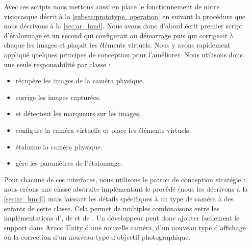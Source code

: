 Avec ces scripts nous mettons aussi en place le fonctionnement de notre visiocasque décrit à la \autoref{subsec:prototype_operation} en suivant la procédure que nous décrivons à la \autoref{sec:ar_hmd}. Nous avons donc d'abord écrit premier script d'étalonnage et un second qui configurait au démarrage puis qui corrigeait à chaque  les images et plaçait les éléments virtuels. Nous y avons rapidement appliqué quelques principes de conception pour l'améliorer. Nous utilisons donc une seule responsabilité par classe  :
\begin{itemize}
  \item {} récupère les images de la caméra physique.
  \item {} corrige les images capturées.
  \item {} et  détectent les marqueurs sur les images.
  \item {} configure la caméra virtuelle et place les éléments virtuels.
  \item {} étalonne la caméra physique.
  \item {} gère les paramètres de l'étalonnage.
\end{itemize}
\bigskip

Pour chacune de ces interfaces, nous utilisons le patron de conception stratégie : nous créons une classe abstraite implémentant le procédé (nous les décrivons à la \autoref{sec:ar_hmd}) mais laissant les détails spécifiques à un type de caméra à des enfants de cette classe. Cela permet de multiples combinaisons entre les implémentations d', de  et de . Un développeur peut donc ajouter facilement le support dans Aruco Unity d'une nouvelle caméra, d'un nouveau type d'affichage ou la correction d'un nouveau type d'objectif photographique.

